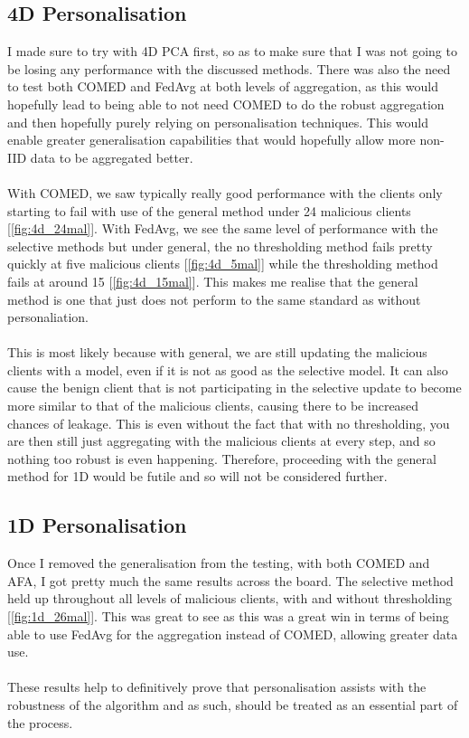 \subsection{4D Personalisation}
I made sure to try with 4D PCA first, so as to make sure that I was not going to be losing any performance with the discussed methods.
There was also the need to test both COMED and FedAvg at both levels of aggregation, as this would hopefully lead to being able to not need COMED to do the robust aggregation and then hopefully purely relying on personalisation techniques.
This would enable greater generalisation capabilities that would hopefully allow more non-IID data to be aggregated better.
\\ \\ 
With COMED, we saw typically really good performance with the clients only starting to fail with use of the general method under 24 malicious clients [\ref{fig:4d_24mal}].
With FedAvg, we see the same level of performance with the selective methods but under general, the no thresholding method fails pretty quickly at five malicious clients [\ref{fig:4d_5mal}] while the thresholding method fails at around 15 [\ref{fig:4d_15mal}].
This makes me realise that the general method is one that just does not perform to the same standard as without personaliation.
\\ \\
This is most likely because with general, we are still updating the malicious clients with a model, even if it is not as good as the selective model.
It can also cause the benign client that is not participating in the selective update to become more similar to that of the malicious clients, causing there to be increased chances of leakage.
This is even without the fact that with no thresholding, you are then still just aggregating with the malicious clients at every step, and so nothing too robust is even happening.
Therefore, proceeding with the general method for 1D would be futile and so will not be considered further.



\subsection{1D Personalisation}
Once I removed the generalisation from the testing, with both COMED and AFA, I got pretty much the same results across the board.
The selective method held up throughout all levels of malicious clients, with and without thresholding [\ref{fig:1d_26mal}].
This was great to see as this was a great win in terms of being able to use FedAvg for the aggregation instead of COMED, allowing greater data use.
\\ \\
These results help to definitively prove that personalisation assists with the robustness of the algorithm and as such, should be treated as an essential part of the process.


